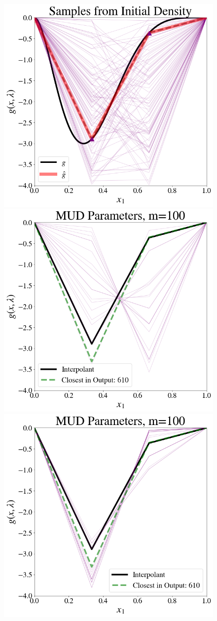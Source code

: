 \begin{frame}[t]
\begin{figure}[htbp]
\centering
    \includegraphics[width=0.325\linewidth]{figures/pde-highd/pde-highd_init_D2.png}
    \includegraphics[width=0.325\linewidth]{figures/pde-highd/pde-highd_pair_D2-1_m100.png}
    \includegraphics[width=0.325\linewidth]{figures/pde-highd/pde-highd_pair_D2-2_m100.png}
\label{fig:pde-MUD}
\end{figure}
\end{frame}
